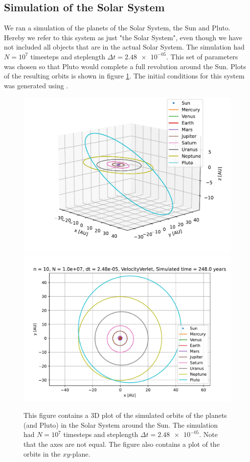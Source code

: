 \documentclass[reprint,english,notitlepage]{revtex4-1}  %
\begin{document}
\subsection{Simulation of the Solar System} \label{sec:IV:f}

We ran a simulation of the planets of the Solar System, the Sun and Pluto. Hereby we refer to this system as just "the Solar System", even though we have not included all objects that are in the actual Solar System. The simulation had $N = 10^7$ timesteps and steplength $\Delta t = \num{2.48e-05}$. This set of parameters was chosen so that Pluto would complete a full revolution around the Sun. Plots of the resulting orbits is shown in figure \ref{fig:ss}. The initial conditions for this system was generated using \citep{NASASolarInit}.

\begin{figure}[H]
\includegraphics[width=\columnwidth]{../data/figures/sun_and_friends/ss_248_vv_orbits3D.pdf}
\includegraphics[width=\columnwidth]{../data/figures/sun_and_friends/ss_248_vv_orbits2D.pdf}
\caption{This figure contains a 3D plot of the simulated orbits of the planets (and Pluto) in the Solar System around the Sun. The simulation had $N = 10^7$ timesteps and steplength $\Delta t = \num{2.48e-05}$. Note that the axes are not equal. The figure also contains a plot of the orbits in the $xy$-plane.}
\label{fig:ss}
\end{figure}
\end{document}
